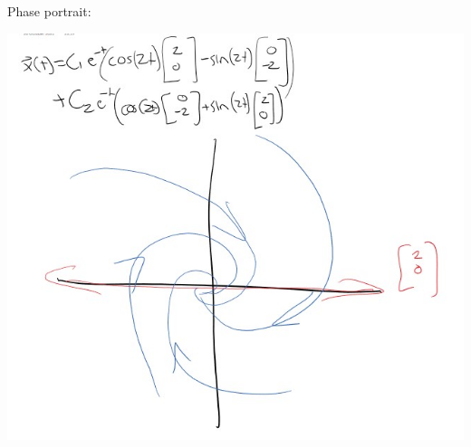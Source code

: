 \documentclass[12pt]{article}
\begin{document}
Phase portrait:

\includegraphics{Images/phase.jpg}

\pagebreak
\end{document}
